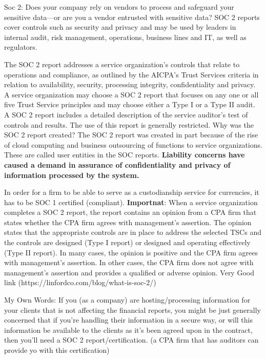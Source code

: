 \par
Soc 2: Does your company rely on vendors to process and safeguard your sensitive data—or are you a vendor entrusted with sensitive data? SOC 2 reports cover controls such as security and privacy and may be used by leaders in internal audit, risk management, operations, business lines and IT, as well as regulators.

The SOC 2 report addresses a service organization’s controls that relate to operations and compliance, as outlined by the AICPA’s Trust Services criteria in relation to availability, security, processing integrity, confidentiality and privacy. A service organization may choose a SOC 2 report that focuses on any one or all five Trust Service principles and may choose either a Type I or a Type II audit. A SOC 2 report includes a detailed description of the service auditor’s test of controls and results. The use of this report is generally restricted.
Why was the SOC 2 report created?
The SOC 2 report was created in part because of the rise of cloud computing and business outsourcing of functions to service organizations. These are called user entities in the SOC reports. \textbf{Liability concerns have caused a demand in assurance of confidentiality and privacy of information processed by the system.}

\par
In order for a firm to be able to serve as a custodianship service for currencies, it has to be SOC 1 certified (compliant).
\textbf{Importnat}: When a service organization completes a SOC 2 report, the report contains an opinion from a CPA firm that states whether the CPA firm agrees with management’s assertion. The opinion states that the appropriate controls are in place to address the selected TSCs and the controls are designed (Type I report) or designed and operating effectively (Type II report). In many cases, the opinion is positive and the CPA firm agrees with management’s assertion. In other cases, the CPA firm does not agree with management’s assertion and provides a qualified or adverse opinion. Very Good link (https://linfordco.com/blog/what-is-soc-2/)

My Own Words: If you (as a company) are hosting/processing information for your clients that is not affecting the financial reports, you might be just generally concerned that if you're handling their information in a secure way, or will this information be available to the clients as it's been agreed upon in the contract, then you'll need a SOC 2 report/certification.  (a CPA firm that has auditors can provide yo with this certification)
 
